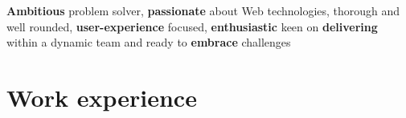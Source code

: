 \vspace{-0.6cm}
{\textbf{Ambitious} problem solver, \textbf{passionate} about Web technologies, thorough and well rounded, \textbf{user-experience} focused, \textbf{enthusiastic} keen on \textbf{delivering} within a dynamic team and ready to \textbf{embrace} challenges}

\vspace{-.04cm}
\section{\normalfont Work experience}
\vspace{-.1cm}

